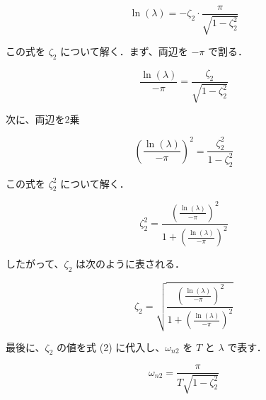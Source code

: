 \[
  \ln(\lambda) = -\zeta_2 \cdot \frac{\pi}{\sqrt{1 - \zeta_2^2}} \tag{5}
\]

この式を \(\zeta_2\) について解く．まず、両辺を \(-\pi\) で割る．

\[
  \frac{\ln(\lambda)}{-\pi} = \frac{\zeta_2}{\sqrt{1 - \zeta_2^2}} \tag{6}
\]

次に、両辺を2乗

\[
  \left( \frac{\ln(\lambda)}{-\pi} \right)^2 = \frac{\zeta_2^2}{1 - \zeta_2^2} \tag{7}
\]

この式を \(\zeta_2^2\) について解く．

\[
  \zeta_2^2 = \frac{\left( \frac{\ln(\lambda)}{-\pi} \right)^2}{1 + \left( \frac{\ln(\lambda)}{-\pi} \right)^2} \tag{8}
\]

したがって、\(\zeta_2\) は次のように表される．

\[
  \zeta_2 = \sqrt{\frac{\left( \frac{\ln(\lambda)}{-\pi} \right)^2}{1 + \left( \frac{\ln(\lambda)}{-\pi} \right)^2}} \tag{9}
\]

最後に、\(\zeta_2\) の値を式 (2) に代入し、\(\omega_{n2}\) を \(T\) と \(\lambda\) で表す．

\[
  \omega_{n2} = \frac{\pi}{T \sqrt{1 - \zeta_2^2}} \tag{10}
\]


